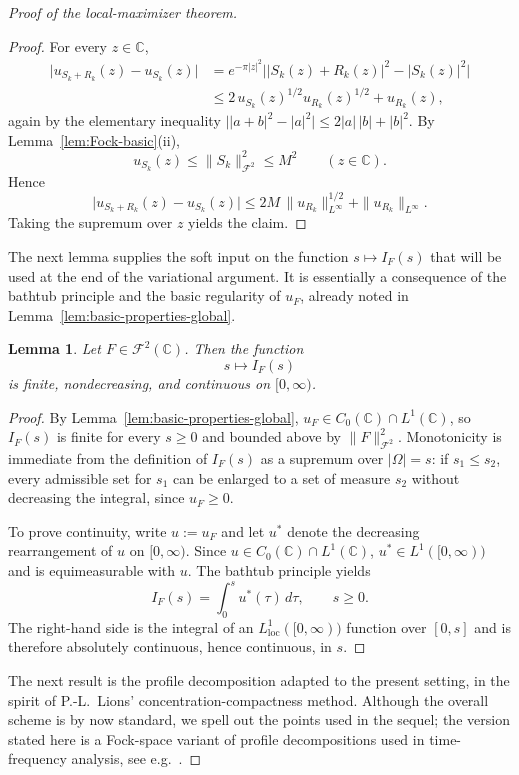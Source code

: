 \documentclass[a4paper,11pt,reqno]{amsart}
\numberwithin{equation}{section}
\theoremstyle{plain} %
\newtheorem{lemma}{Lemma}[section]
\theoremstyle{definition} %
\theoremstyle{remark}
\newcommand{\C}{\mathbb{C}}
\begin{document}
\begin{proof}[Proof of the local-maximizer theorem]
\begin{proof}
For every \(z\in \C\),
\begin{align*}
\big|u_{S_k+R_k}(z)-u_{S_k}(z)\big|
&=
e^{-\pi |z|^2}\big||S_k(z)+R_k(z)|^2-|S_k(z)|^2\big| \\
&\le
2\,u_{S_k}(z)^{1/2}u_{R_k}(z)^{1/2}
+u_{R_k}(z),
\end{align*}
again by the elementary inequality
\(\big||a+b|^2-|a|^2\big|\le 2|a|\,|b|+|b|^2\). By
Lemma~\ref{lem:Fock-basic}(ii),
\[
u_{S_k}(z)\le \|S_k\|_{\mathcal F^2}^2\le M^2
\qquad (z\in\C).
\]
Hence
\[
\big|u_{S_k+R_k}(z)-u_{S_k}(z)\big|
\le
2M\,\|u_{R_k}\|_{L^\infty}^{1/2}
+\|u_{R_k}\|_{L^\infty}.
\]
Taking the supremum over \(z\) yields the claim.
\end{proof}

The next lemma supplies the soft input on the function \(s\mapsto I_F(s)\)
that will be used at the end of the variational argument. It is essentially a
consequence of the bathtub principle and the basic regularity of \(u_F\),
already noted in Lemma~\ref{lem:basic-properties-global}.

\begin{lemma}\label{lem:I-continuity-global}
Let \(F\in \mathcal F^2(\C)\). Then the function
\[
s\mapsto I_F(s)
\]
is finite, nondecreasing, and continuous on \([0,\infty)\).
\end{lemma}

\begin{proof}
By Lemma~\ref{lem:basic-properties-global},
\(u_F\in C_0(\C)\cap L^1(\C)\), so \(I_F(s)\) is finite for every \(s\ge 0\)
and bounded above by \(\|F\|_{\mathcal F^2}^2\). Monotonicity is immediate
from the definition of \(I_F(s)\) as a supremum over \(|\Omega|=s\): if
\(s_1\le s_2\), every admissible set for \(s_1\) can be enlarged to a set of
measure \(s_2\) without decreasing the integral, since \(u_F\ge 0\).

To prove continuity, write \(u:=u_F\) and let \(u^*\) denote the decreasing
rearrangement of \(u\) on \([0,\infty)\). Since \(u\in C_0(\C)\cap L^1(\C)\),
\(u^*\in L^1([0,\infty))\) and is equimeasurable with \(u\). The bathtub
principle yields
\[
I_F(s)=\int_0^s u^*(\tau)\,d\tau,\qquad s\ge 0.
\]
The right-hand side is the integral of an
\(L^1_{\mathrm{loc}}([0,\infty))\) function over \([0,s]\) and is therefore
absolutely continuous, hence continuous, in \(s\).
\end{proof}

The next result is the profile decomposition adapted to the present setting,
in the spirit of P.-L.~Lions' concentration-compactness method. Although the
overall scheme is by now standard, we spell out the points used in the
sequel; the version stated here is a Fock-space variant of profile
decompositions used in time-frequency analysis, see e.g.\
\cite{Nicola-Romero-Trapasso, Marceca-Romero-Speckbacher, Fulsche-Hagger,
Samuelsen}.


\end{proof}
\end{document}
